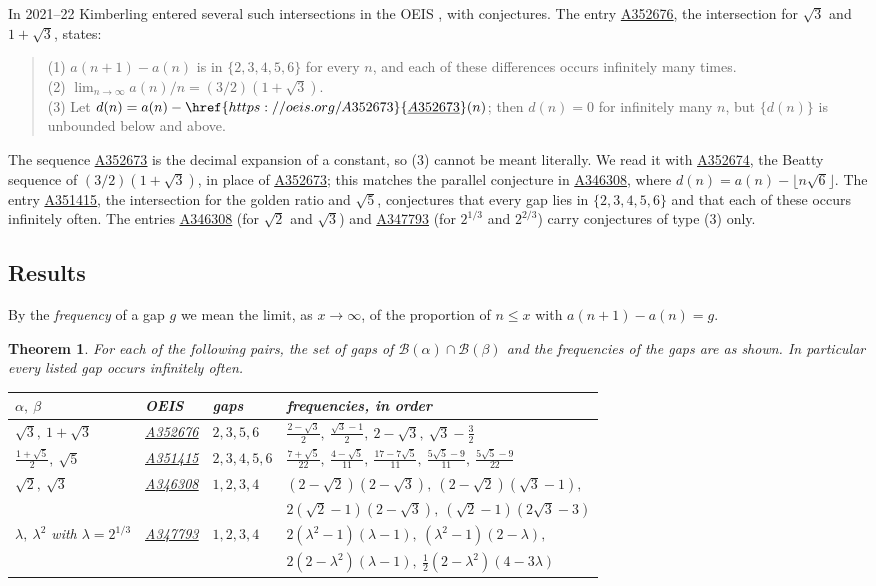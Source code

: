 \documentclass[12pt]{article}
\newcommand{\seqnum}[1]{\href{https://oeis.org/#1}{\underline{#1}}}
\newcommand{\fl}[1]{\lfloor #1 \rfloor}
\newcommand{\B}{\mathcal{B}}
\theoremstyle{plain}
\newtheorem{theorem}{Theorem}
\theoremstyle{remark}
\begin{document}
In 2021--22 Kimberling entered several such intersections in the OEIS \cite{oeis}, with
conjectures. The entry \seqnum{A352676}, the intersection for $\sqrt3$ and $1+\sqrt3$, states:
\begin{quote}
(1) $a(n+1)-a(n)$ is in $\{2,3,4,5,6\}$ for every $n$, and each of these differences occurs
infinitely many times.\\
(2) $\lim_{n\to\infty} a(n)/n = (3/2)(1+\sqrt3)$.\\
(3) Let $d(n) = a(n) - \seqnum{A352673}(n)$; then $d(n) = 0$ for infinitely many $n$, but
$\{d(n)\}$ is unbounded below and above.
\end{quote}
The sequence \seqnum{A352673} is the decimal expansion of a constant, so (3) cannot be meant
literally. We read it with \seqnum{A352674}, the Beatty sequence of $(3/2)(1+\sqrt3)$, in place
of \seqnum{A352673}; this matches the parallel conjecture in \seqnum{A346308}, where
$d(n)=a(n)-\fl{n\sqrt6}$. The entry \seqnum{A351415}, the intersection for the golden ratio and
$\sqrt5$, conjectures that every gap lies in $\{2,3,4,5,6\}$ and that each of these occurs
infinitely often. The entries \seqnum{A346308} (for $\sqrt2$ and $\sqrt3$) and
\seqnum{A347793} (for $2^{1/3}$ and $2^{2/3}$) carry conjectures of type (3) only.

\subsection*{Results}

By the \emph{frequency} of a gap $g$ we mean the limit, as $x\to\infty$, of the proportion of
$n\le x$ with $a(n+1)-a(n)=g$.

\begin{theorem}\label{thm:gaps}
For each of the following pairs, the set of gaps of $\B(\alpha)\cap\B(\beta)$ and the
frequencies of the gaps are as shown. In particular every listed gap occurs infinitely often.
\begin{center}
\renewcommand{\arraystretch}{1.25}
\begin{tabular}{llll}
\toprule
$\alpha,\ \beta$ & OEIS & gaps & frequencies, in order\\
\midrule
$\sqrt3,\ 1+\sqrt3$ & \seqnum{A352676} & $2,3,5,6$ &
 $\frac{2-\sqrt3}{2},\ \frac{\sqrt3-1}{2},\ 2-\sqrt3,\ \sqrt3-\frac32$\\
$\frac{1+\sqrt5}{2},\ \sqrt5$ & \seqnum{A351415} & $2,3,4,5,6$ &
 $\frac{7+\sqrt5}{22},\ \frac{4-\sqrt5}{11},\ \frac{17-7\sqrt5}{11},\ \frac{5\sqrt5-9}{11},\ \frac{5\sqrt5-9}{22}$\\
$\sqrt2,\ \sqrt3$ & \seqnum{A346308} & $1,2,3,4$ &
 $(2-\sqrt2)(2-\sqrt3),\ (2-\sqrt2)(\sqrt3-1),$\\
 & & & $2(\sqrt2-1)(2-\sqrt3),\ (\sqrt2-1)(2\sqrt3-3)$\\
$\lambda,\ \lambda^2$ with $\lambda=2^{1/3}$ & \seqnum{A347793} & $1,2,3,4$ &
 $2(\lambda^2-1)(\lambda-1),\ (\lambda^2-1)(2-\lambda),$\\
 & & & $2(2-\lambda^2)(\lambda-1),\ \tfrac12(2-\lambda^2)(4-3\lambda)$\\
\bottomrule
\end{tabular}
\end{center}
\end{theorem}
\end{document}
